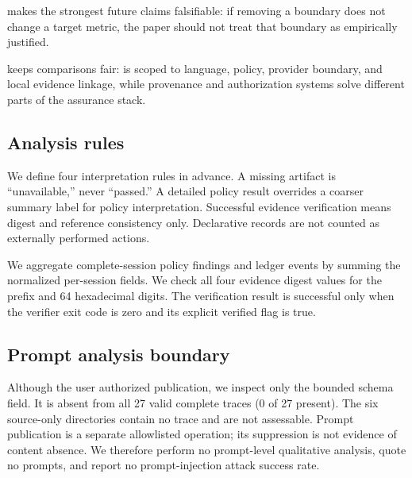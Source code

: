 \begin{table}[t]
\centering
\caption{Required ablation study. Metrics in the last column are measurement
obligations, not current results.}
\label{tab:ablation}

\end{table}

 makes the strongest future claims falsifiable: if removing
a boundary does not change a target metric, the paper should not treat that
boundary as empirically justified.

\begin{table}[t]
\centering
\caption{Baseline comparison by scope. Baselines are not adversaries; they
identify which assurance layer each system does or does not cover.}
\label{tab:baselines}

\end{table}

 keeps comparisons fair: \Argorix is scoped to language,
policy, provider boundary, and local evidence linkage, while provenance and
authorization systems solve different parts of the assurance stack.

\subsection{Analysis rules}
We define four interpretation rules in advance.  A missing artifact is
``unavailable,'' never ``passed.''  A detailed policy result overrides a
coarser summary label for policy interpretation.  Successful evidence
verification means digest and reference consistency only.  Declarative records
are not counted as externally performed actions.

We aggregate complete-session policy findings and ledger events by summing the
normalized per-session fields.  We check all four evidence digest values for
the  prefix and 64 hexadecimal digits.  The verification result
is successful only when the verifier exit code is zero and its explicit
verified flag is true.

\subsection{Prompt analysis boundary}
Although the user authorized publication, we inspect only the bounded
 schema field.  It is absent from all 27 valid
complete traces (0 of 27 present).  The six source-only directories contain no
trace and are not assessable.  Prompt publication is a separate allowlisted
operation; its suppression is not evidence of content absence.  We therefore
perform no prompt-level qualitative analysis, quote no prompts, and report no
prompt-injection attack success rate.
